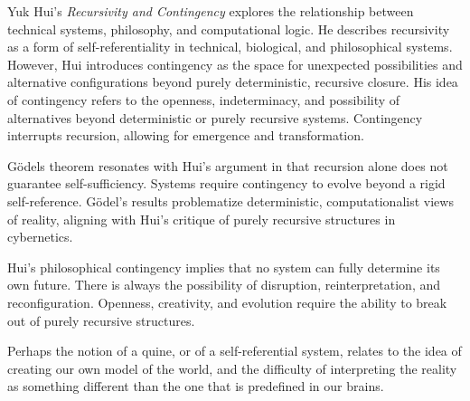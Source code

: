 Yuk Hui's \textit{Recursivity and Contingency} \citep{hui2019} explores the relationship between technical systems, philosophy, and computational logic. He describes recursivity as a form of self-referentiality in technical, biological, and philosophical systems. However, Hui introduces contingency as the space for unexpected possibilities and alternative configurations beyond purely deterministic, recursive closure. His idea of contingency refers to the openness, indeterminacy, and possibility of alternatives beyond deterministic or purely recursive systems. Contingency interrupts recursion, allowing for emergence and transformation.

Gödels theorem resonates with Hui's argument in that recursion alone does not guarantee self-sufficiency. Systems require contingency to evolve beyond a rigid self-reference. Gödel's results problematize deterministic, computationalist views of reality, aligning with Hui's critique of purely recursive structures in cybernetics.

Hui's philosophical contingency implies that no system can fully determine its own future. There is always the possibility of disruption, reinterpretation, and reconfiguration. Openness, creativity, and evolution require the ability to break out of purely recursive structures.

Perhaps the notion of a quine, or of a self-referential system, relates to the idea of creating our own model of the world, and the difficulty of interpreting the reality as something different than the one that is predefined in our brains. 

\footnotesize 
\begin{tcolorbox}[colback=gray!20, colframe=black, arc=2mm, boxrule=0.8pt]
\end{tcolorbox}
\normalsize